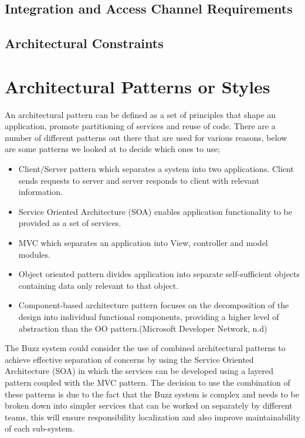 \documentclass[a4paper]{article}
\begin{document}
\subsection{Integration and Access Channel Requirements}

\subsection{Architectural Constraints}

\section{Architectural Patterns or Styles}
An architectural pattern can be defined as a set of principles that shape an application, promote partitioning of services and reuse of code. There are a number of different patterns out there that are used for various reasons, below are some patterns we looked at to decide which ones to use;
\begin{itemize}
			\item Client/Server pattern which separates a system into two applications. Client sends requests to server and server responds to client with relevant information.
			\item Service Oriented Architecture (SOA) enables application functionality to be provided as a set of services.
			\item MVC which separates an application into View, controller and model modules.
			\item Object oriented pattern divides application into separate self-sufficient objects containing data only relevant to that object.
			\item Component-based architecture pattern focuses on the decomposition of the design into individual functional components, providing a higher level of abstraction than the OO pattern.(Microsoft Developer Network, n.d) \\[1em]
\end{itemize}
The Buzz system could consider the use of combined architectural patterns to achieve effective separation of concerns by using the Service Oriented Architecture (SOA) in which the services can be developed using a layered pattern coupled with the MVC pattern. 
The decision to use the combination of these patterns is due to the fact that the Buzz system is complex and needs to be broken down into simpler services that can be worked on separately by different teams, this will ensure responsibility localization and also improve maintainability of each sub-system. 
\end{document}
